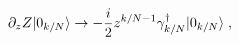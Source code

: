 \begin{equation}
\partial_z Z \vert 0_{k/N} \rangle \rightarrow -{i\over 2} z^{k/N-1}
 \gamma_{k/N}^\dagger  \vert 0_{k/N} \rangle\;,
\end{equation}

